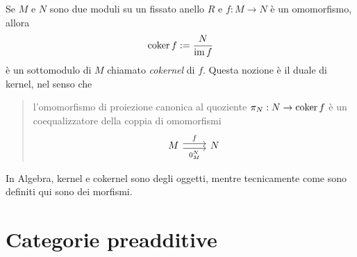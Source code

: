 \begin{example}
  Se \(M\) e \(N\) sono due moduli su un fissato anello \(R\) e
  \(f : M \to N\) è un omomorfismo, allora
  \[
    \operatorname{coker} f := \frac{N}{\operatorname{im} f}
  \]
  è un sottomodulo di \(M\) chiamato {\em cokernel} di \(f\). Questa
  nozione è il duale di kernel, nel senso che
  \begin{quotation}
    l'omomorfismo di proiezione canonica al quoziente
    \(\pi_N : N \to \operatorname{coker} f\) è un coequalizzatore della coppia di
    omomorfismi
    \[
      \begin{tikzcd}
        M \ar["f", shift left, r] \ar["{0_M^N}", shift right, swap, r]
        & N
      \end{tikzcd}
    \]
  \end{quotation}
\end{example}

\begin{remark}
  In Algebra, kernel e cokernel sono degli oggetti, mentre
  tecnicamente come sono definiti qui sono dei morfismi.
\end{remark}



\section{Categorie preadditive}

